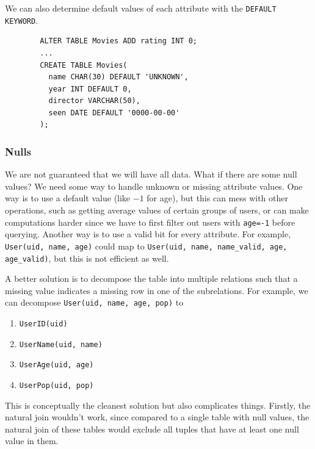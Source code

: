     \begin{theorem}
      \label{thm:default}
      We can also determine default values of each attribute with the \texttt{DEFAULT KEYWORD}. 
      \begin{lstlisting}
        ALTER TABLE Movies ADD rating INT 0; 
        ...
        CREATE TABLE Movies(
          name CHAR(30) DEFAULT 'UNKNOWN', 
          year INT DEFAULT 0, 
          director VARCHAR(50), 
          seen DATE DEFAULT '0000-00-00'
        ); 
      \end{lstlisting}
    \end{theorem}

  \subsubsection{Nulls}

    We are not guaranteed that we will have all data. What if there are some null values? We need some way to handle unknown or missing attribute values. One way is to use a default value (like $-1$ for age), but this can mess with other operations, such as getting average values of certain groups of users, or can make computations harder since we have to first filter out users with \texttt{age=-1} before querying. Another way is to use a valid bit for every attribute. For example, \texttt{User(uid, name, age)} could map to \texttt{User(uid, name, name\_valid, age, age\_valid)}, but this is not efficient as well. 

    A better solution is to decompose the table into multiple relations such that a missing value indicates a missing row in one of the subrelations. For example, we can decompose \texttt{User(uid, name, age, pop)} to 
    \begin{enumerate}
      \item \texttt{UserID(uid)}
      \item \texttt{UserName(uid, name)}
      \item \texttt{UserAge(uid, age)}
      \item \texttt{UserPop(uid, pop)}
    \end{enumerate}
    This is conceptually the cleanest solution but also complicates things. Firstly, the natural join wouldn't work, since compared to a single table with null values, the natural join of these tables would exclude all tuples that have at least one null value in them. 

